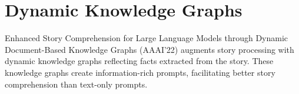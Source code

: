 \documentclass{sigkddExp}
\begin{document}
\section{Dynamic Knowledge Graphs}
\vspace{3mm}
Enhanced Story Comprehension for Large Language Models through Dynamic Document-Based Knowledge Graphs (AAAI'22) augments story processing with dynamic knowledge graphs reflecting facts extracted from the story. These knowledge graphs create information-rich prompts, facilitating better story comprehension than text-only prompts.
\end{document}
